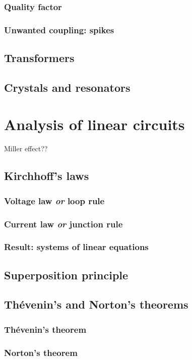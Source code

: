 \documentclass{report}
\begin{document}
\subsection{Quality factor}
\subsection{Unwanted coupling: spikes}
\section{Transformers}
\section{Crystals and resonators}

\chapter{Analysis of linear circuits}
Miller effect??
\section{Kirchhoff's laws}
\subsection{Voltage law \textit{or} loop rule}
\subsection{Current law \textit{or} junction rule}
\subsection{Result: systems of linear equations}
\section{Superposition principle}
\section{Thévenin's and Norton's theorems}
\subsection{Thévenin's theorem}
\subsection{Norton's theorem}
\end{document}
